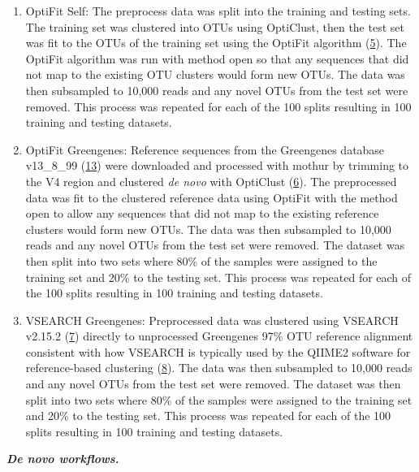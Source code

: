 \documentclass[
]{article}
\providecommand{\tightlist}{%
  \setlength{\itemsep}{0pt}\setlength{\parskip}{0pt}}
\begin{document}
\begin{enumerate}
\def\labelenumi{\arabic{enumi}.}
\tightlist
\item
  OptiFit Self: The preprocess data was split into the training and
  testing sets. The training set was clustered into OTUs using
  OptiClust, then the test set was fit to the OTUs of the training set
  using the OptiFit algorithm (\protect\hyperlink{ref-sovacool2022}{5}).
  The OptiFit algorithm was run with method open so that any sequences
  that did not map to the existing OTU clusters would form new OTUs. The
  data was then subsampled to 10,000 reads and any novel OTUs from the
  test set were removed. This process was repeated for each of the 100
  splits resulting in 100 training and testing datasets.
\item
  OptiFit Greengenes: Reference sequences from the Greengenes database
  v13\_8\_99 (\protect\hyperlink{ref-desantis2006}{13}) were downloaded
  and processed with mothur by trimming to the V4 region and clustered
  \emph{de novo} with OptiClust
  (\protect\hyperlink{ref-westcott2017}{6}). The preprocessed data was
  fit to the clustered reference data using OptiFit with the method open
  to allow any sequences that did not map to the existing reference
  clusters would form new OTUs. The data was then subsampled to 10,000
  reads and any novel OTUs from the test set were removed. The dataset
  was then split into two sets where 80\% of the samples were assigned
  to the training set and 20\% to the testing set. This process was
  repeated for each of the 100 splits resulting in 100 training and
  testing datasets.
\item
  VSEARCH Greengenes: Preprocessed data was clustered using VSEARCH
  v2.15.2 (\protect\hyperlink{ref-rognes2016}{7}) directly to
  unprocessed Greengenes 97\% OTU reference alignment consistent with
  how VSEARCH is typically used by the QIIME2 software for
  reference-based clustering (\protect\hyperlink{ref-bolyen2019}{8}).
  The data was then subsampled to 10,000 reads and any novel OTUs from
  the test set were removed. The dataset was then split into two sets
  where 80\% of the samples were assigned to the training set and 20\%
  to the testing set. This process was repeated for each of the 100
  splits resulting in 100 training and testing datasets.
\end{enumerate}

\textbf{\emph{De novo workflows.}}
\end{document}
